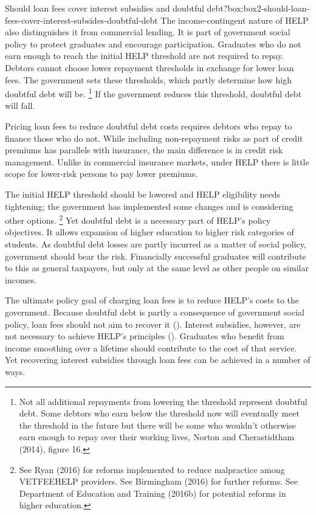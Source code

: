 \documentclass[embargoed]{grattan}
\begin{document}
{\begin{bigbox*}{Should loan fees cover interest subsidies and doubtful debt?}{box:box2-should-loan-fees-cover-interest-subsides-doubtful-debt}
The income-contingent nature of \gls{HELP} also distinguishes it from commercial lending.
It is part of government social policy to protect graduates and encourage participation.
Graduates who do not earn enough to reach the initial \gls{HELP} threshold are not required to repay.
Debtors cannot choose lower repayment thresholds in exchange for lower loan fees.
The government sets these thresholds, which partly determine how high doubtful debt will be.%
\footnote{Not all additional repayments from lowering the threshold represent doubtful debt.
Some debtors who earn below the threshold now will eventually meet the threshold in the future but there will be some who wouldn't otherwise earn enough to repay over their working lives, Norton and Cherastidtham (2014), figure 16.} If the government reduces this threshold, doubtful debt will fall.

Pricing loan fees to reduce doubtful debt costs requires debtors who repay to finance those who do not.
While including non-repayment risks as part of credit premiums has parallels with insurance, the main difference is in credit risk management.
Unlike in commercial insurance markets, under \gls{HELP} there is little scope for lower-risk persons to pay lower premiums.

The initial \gls{HELP} threshold should be lowered and \gls{HELP} eligibility needs tightening; the government has implemented some changes and is considering other options.%
\footnote{See Ryan (2016) for reforms implemented to reduce malpractice among \gls{VETFEEHELP} providers.
See Birmingham (2016) for further reforms.
See Department of Education and Training (2016b) for potential reforms in higher education.} Yet doubtful debt is a necessary part of \gls{HELP}'s policy objectives.
It allows expansion of higher education to higher risk categories of students.
As doubtful debt losses are partly incurred as a matter of social policy, government should bear the risk.
Financially successful graduates will contribute to this as general taxpayers, but only at the same level as other people on similar incomes.
\end{bigbox*}

The ultimate policy goal of charging loan fees is to reduce \gls{HELP}'s costs to the government.
Because doubtful debt is partly a consequence of government social policy, loan fees should not aim to recover it ().
Interest subsidies, however, are not necessary to achieve \gls{HELP}'s principles ().
Graduates who benefit from income smoothing over a lifetime should contribute to the cost of that service.
Yet recovering interest subsidies through loan fees can be achieved in a number of ways.

}
\end{document}

